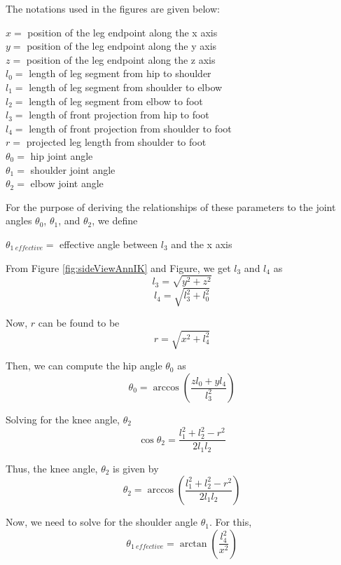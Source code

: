The notations used in the figures are given below:

\begin{flushleft}
\(x = \) position of the leg endpoint along the x axis\\
\(y = \) position of the leg endpoint along the y axis\\
\(z = \) position of the leg endpoint along the z axis\\
\(l_0 = \) length of leg segment from hip to shoulder\\
\(l_1 = \) length of leg segment from shoulder to elbow\\
\(l_2 = \) length of leg segment from elbow to foot\\
\(l_3 = \) length of front projection from hip to foot\\
\(l_4 = \) length of front projection from shoulder to foot\\
\(r = \) projected leg length from shoulder to foot\\
\(\theta_0 = \) hip joint angle\\
\(\theta_1 = \) shoulder joint angle\\
\(\theta_2 = \) elbow joint angle\\

\end{flushleft}

For the purpose of deriving the relationships of these parameters to the joint angles \(\theta_0\), \(\theta_1\), and \(\theta_2\), we define

\begin{flushleft}
\(\theta_{1 \ effective} = \) effective angle between \(l_3\) and the x axis
\end{flushleft}

From Figure \ref{fig:sideViewAnnIK} and Figure, we get \(l_3\) and \(l_4\) as
\[l_3 = \sqrt{y^2 + z^2}\]
\[l_4 = \sqrt{l_3^2 + l_0^2}\]

Now, \(r\) can be found to be
\[r = \sqrt{x^2 + l_4^2}\]

Then, we can compute the hip angle \(\theta_0\) as
\[\theta_0 = \arccos{\left( \frac{z l_0 + y l_4}{l_3^2} \right)}\]

Solving for the knee angle, \(\theta_2\)
\[\cos{\theta_2} = \frac{l_1^2 + l_2^2 - r^2}{2 l_1 l_2}\]

Thus, the knee angle, \(\theta_2\) is given by
\[\theta_2 = \arccos{\left( \frac{l_1^2 + l_2^2 - r^2}{2 l_1 l_2} \right)}\]

Now, we need to solve for the shoulder angle \(\theta_1\). For this,
\[\theta_{1 \ effective} = \arctan{\left( \frac{l_4^2}{x^2} \right)}\]


